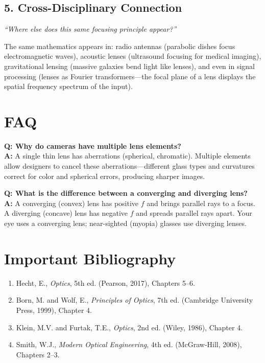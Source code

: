 \subsection*{5. Cross-Disciplinary Connection}
\textit{``Where else does this same focusing principle appear?''}

The same mathematics appears in: radio antennas (parabolic dishes focus electromagnetic waves), acoustic lenses (ultrasound focusing for medical imaging), gravitational lensing (massive galaxies bend light like lenses), and even in signal processing (lenses as Fourier transformers---the focal plane of a lens displays the spatial frequency spectrum of the input).
\section*{FAQ}

\textbf{Q: Why do cameras have multiple lens elements?}\\
\textbf{A:} A single thin lens has aberrations (spherical, chromatic). Multiple elements allow designers to cancel these aberrations---different glass types and curvatures correct for color and spherical errors, producing sharper images.

\textbf{Q: What is the difference between a converging and diverging lens?}\\
\textbf{A:} A converging (convex) lens has positive $f$ and brings parallel rays to a focus. A diverging (concave) lens has negative $f$ and spreads parallel rays apart. Your eye uses a converging lens; near-sighted (myopia) glasses use diverging lenses.
\section*{Important Bibliography}

\begin{enumerate}
\item Hecht, E., \textit{Optics}, 5th ed. (Pearson, 2017), Chapters 5--6.
\item Born, M. and Wolf, E., \textit{Principles of Optics}, 7th ed. (Cambridge University Press, 1999), Chapter 4.
\item Klein, M.V. and Furtak, T.E., \textit{Optics}, 2nd ed. (Wiley, 1986), Chapter 4.
\item Smith, W.J., \textit{Modern Optical Engineering}, 4th ed. (McGraw-Hill, 2008), Chapters 2--3.
\end{enumerate}


